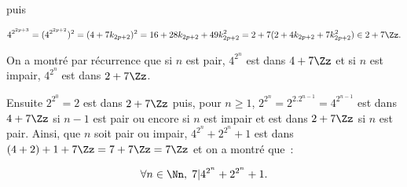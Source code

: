 {\begin{enumerate}
{puis 

$$4^{2^{2p+3}}=(4^{2^{2p+2}})^2=(4+7k_{2p+2})^2=16+28k_{2p+2}+49k_{2p+2}^2=2+7(2+4k_{2p+2}+7k_{2p+2}^2)\in2+7\Zz.$$

On a montré par récurrence que si $n$ est pair, $4^{2^n}$ est dans $4+7\Zz$ et si $n$ est impair, $4^{2^n}$ est dans $2+7\Zz$.

Ensuite $2^{2^0}=2$ est dans $2+7\Zz$ puis, pour $n\geq1$, $2^{2^n}=2^{2.2^{n-1}}=4^{2^{n-1}}$ est dans $4+7\Zz$ si $n-1$ est pair ou encore si $n$ est impair et est dans $2+7\Zz$ si $n$ est pair. Ainsi, que $n$ soit pair ou impair, $4^{2^n}+2^{2^n}+1$ est dans $(4+2)+1+7\Zz=7+7\Zz=7\Zz$ et on a montré que~:

$$\forall n\in\Nn,\;7|4^{2^n}+2^{2^n}+1.$$}
\end{enumerate}
}
